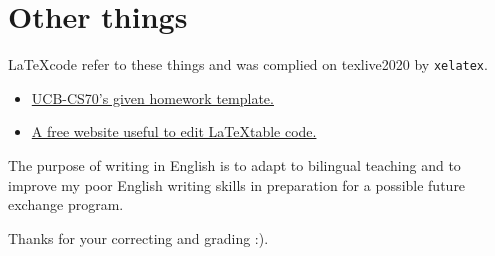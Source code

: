 \documentclass[11pt, oneside]{article}  %
\begin{document}
\section*{Other things}

    \LaTeX \space code refer to these things and was complied on texlive2020 by \lstinline{xelatex}.
    \begin{itemize}
        \item  \href{https://www.eecs70.org/assets/misc/homework_template.tex}{UCB-CS70's given homework template.} 
        \item  \href{https://www.tablesgenerator.com/}{A free website useful to edit \LaTeX \space table code.}
    \end{itemize}

    The purpose of writing in English is to adapt to bilingual teaching and to improve my poor English 
    writing skills in preparation for a possible future exchange program. 

    Thanks for your correcting and grading :).
\end{document}
